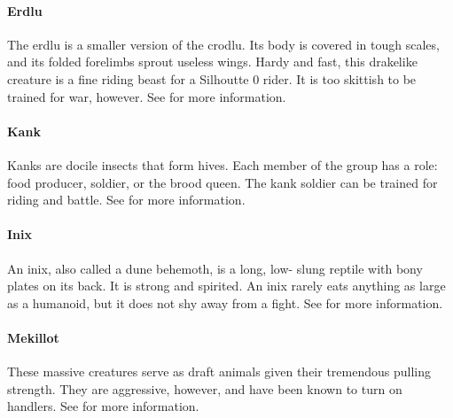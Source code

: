 \begin{multicols}{2}
\paragraph{Erdlu}
\label{itmmnt:erdlu}
The erdlu is a smaller version of the crodlu. Its body
is covered in tough scales, and its folded forelimbs
sprout useless wings. Hardy and fast, this drakelike
creature is a fine riding beast for a Silhoutte 0 rider.
It is too skittish to be trained for war, however. See
 for more information.

\paragraph{Kank}
\label{itmmnt:kank}
Kanks are docile insects that form hives. Each member
of the group has a role: food producer, soldier, or
the brood queen. The kank soldier can be trained for
riding and battle. See  for
more information.

\paragraph{Inix}
\label{itmmnt:inix}
An inix, also called a dune behemoth, is a long, low-
slung reptile with bony plates on its back. It is strong
and spirited. An inix rarely eats anything as large as
a humanoid, but it does not shy away from a fight. See
 for more information.

\paragraph{Mekillot}
\label{itmmnt:mekillot}
These massive creatures serve as draft animals
given their tremendous pulling strength. They are
aggressive, however, and have been known to turn
on handlers. See  for
more information.

\end{multicols}
